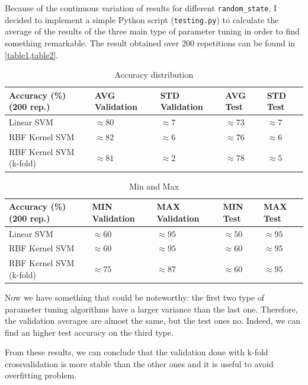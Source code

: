 \documentclass[a4paper, 11pt]{article}
\begin{document}
	Because of the continuous variation of results for different \texttt{random\_state}, I decided to implement a simple Python script (\texttt{testing.py}) to calculate the average of the results of the three main type of parameter tuning in order to find something remarkable.
	The result obtained over 200 repetitions can be found in \vref{table1,table2}.
	\begin{table}[!h]
		\centering
		\caption{Accuracy distribution}
		\label{table1}
		\begin{tabular}{@{}lllll@{}}
			
			\toprule
			\textbf{Accuracy (\%)} (200 rep.)		& AVG Validation	& STD Validation	& AVG Test		& STD Test \\ \midrule
			Linear SVM				& $\approx80$	 	&  $\approx7$		& $\approx73$ & $\approx7$ \\
			RBF Kernel SVM			& $\approx82$	 	&  $\approx6$		& $\approx76$ & $\approx6$ \\
			RBF Kernel SVM (k-fold)	& $\approx81$	 	&  $\approx2$		& $\approx78$ & $\approx5$ \\ \bottomrule
		\end{tabular}
	\end{table}

	\begin{table}[!h]
		\centering
		\caption{Min and Max}
		\label{table2}
		\begin{tabular}{@{}lllll@{}}
			
			\toprule
			\textbf{Accuracy (\%)} (200 rep.)		& MIN Validation	& MAX Validation	& MIN Test		& MAX Test \\ \midrule
			Linear SVM				& $\approx60$	 	&  $\approx95$		& $\approx50$ & $\approx95$ \\
			RBF Kernel SVM			& $\approx60$	 	&  $\approx95$		& $\approx60$ & $\approx95$ \\
			RBF Kernel SVM (k-fold)	& $\approx75$	 	&  $\approx87$		& $\approx60$ & $\approx95$ \\ \bottomrule
		\end{tabular}
	\end{table}

	Now we have something that could be noteworthy: the first two type of parameter tuning algorithms have a larger variance than the last one. Therefore, the validation averages are almost the same, but the test ones no. Indeed, we can find an higher test accuracy on the third type.
	
	From these results, we can conclude that the validation done with k-fold crossvalidation is more stable than the other ones and it is useful to avoid overfitting problem.
		
\end{document}
